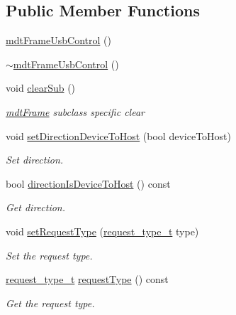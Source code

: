 \subsection*{Public Member Functions}
\begin{DoxyCompactItemize}
\item 
\hyperlink{classmdt_frame_usb_control_ae46317b39840624c4e954a67e7aaa900}{mdt\-Frame\-Usb\-Control} ()
\item 
\hyperlink{classmdt_frame_usb_control_a133678525521c53b308775dcbd4a3f86}{$\sim$mdt\-Frame\-Usb\-Control} ()
\item 
void \hyperlink{classmdt_frame_usb_control_a04aab4a1e3efd99d805dffd8171e78de}{clear\-Sub} ()
\begin{DoxyCompactList}\small\item\em \hyperlink{classmdt_frame}{mdt\-Frame} subclass specific clear \end{DoxyCompactList}\item 
void \hyperlink{classmdt_frame_usb_control_aad3ab6ac60374075f13972679eed6a1b}{set\-Direction\-Device\-To\-Host} (bool device\-To\-Host)
\begin{DoxyCompactList}\small\item\em Set direction. \end{DoxyCompactList}\item 
bool \hyperlink{classmdt_frame_usb_control_af1b656b1f1d41d40d8ae6e1e79d66092}{direction\-Is\-Device\-To\-Host} () const 
\begin{DoxyCompactList}\small\item\em Get direction. \end{DoxyCompactList}\item 
void \hyperlink{classmdt_frame_usb_control_a71457a757e5e6d85a1314c43cd9e93cb}{set\-Request\-Type} (\hyperlink{classmdt_frame_usb_control_a779262a63280a282343ada50acfda3d3}{request\-\_\-type\-\_\-t} type)
\begin{DoxyCompactList}\small\item\em Set the request type. \end{DoxyCompactList}\item 
\hyperlink{classmdt_frame_usb_control_a779262a63280a282343ada50acfda3d3}{request\-\_\-type\-\_\-t} \hyperlink{classmdt_frame_usb_control_a6af55e02c1f80cda83876825f151a28c}{request\-Type} () const 
\begin{DoxyCompactList}\small\item\em Get the request type. \end{DoxyCompactList}\item 

\end{DoxyCompactItemize}
